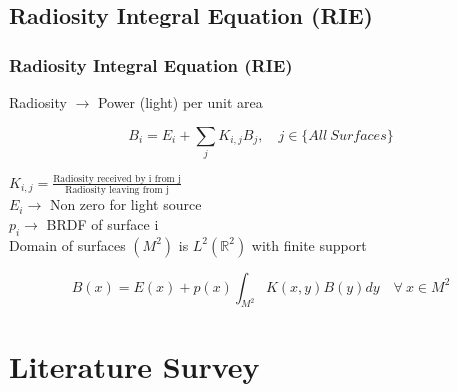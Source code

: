   \subsection{Radiosity Integral Equation (RIE)}


      \begin{frame}\frametitle{Radiosity Integral Equation (RIE)}

      Radiosity $\rightarrow $ Power (light) per unit area
      
      \begin{equation}
      B_i=E_i+\sum_j K_{i,j} B_j, \quad j \in \{All ~ Surfaces\}
      \end{equation}
      
      \centering
      $K_{i,j}=\frac{\text {Radiosity received by i from j}}{\text{Radiosity leaving from j}}$\\
      
      \vspace{2 mm}
      \centering
      $E_i \rightarrow $  Non zero for light source\\
      
      \vspace{2 mm}
      \centering
      $p_i \rightarrow $  BRDF of surface i\\

      \vspace{2 mm}
      \centering
      Domain of surfaces $(M^2)$ is $L^2(\mathbb{R}^2)$ with finite support

      \begin{equation}
      B(x)=E(x)+p(x)\int_{M^2} K(x,y)B(y)dy\quad  \forall ~ x \in M^2
      \end{equation}
      \end{frame}


\section{Literature Survey}

